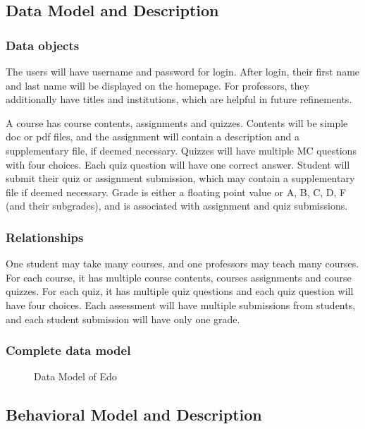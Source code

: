 \documentclass[paper=a4, fontsize=11pt]{scrartcl}
\numberwithin{equation}{section}		%
\numberwithin{figure}{section}			%
\numberwithin{table}{section}				%
\begin{document}
\subsection{Data Model and Description}

\subsubsection{Data objects}
The users will have username and password for login. After login, their first name and last name will be displayed on the homepage. For professors, they additionally have titles and institutions, which are helpful in future refinements.

A course has course contents, assignments and quizzes. Contents will be simple doc or pdf files, and the assignment will contain a description and a supplementary file, if deemed necessary. Quizzes will have multiple MC questions with four choices. Each quiz question will have one correct answer. Student will submit their quiz or assignment submission, which may contain a supplementary file if deemed necessary. Grade is either a floating point value or A, B, C, D, F (and their subgrades), and is associated with assignment and quiz submissions.

\subsubsection{Relationships}
One student may take many courses, and one professors may teach many courses. For each course, it has multiple course contents, courses assignments and course quizzes. For each quiz, it has multiple quiz questions and each quiz question will have four choices. Each assessment will have multiple submissions from students, and each student submission will have only one grade. 

\subsubsection{Complete data model}
\begin{figure}[!ht]
	\begin{center}
	\end{center}
	\caption{Data Model of Edo}
\end{figure}


\subsection{Behavioral Model and Description}
\end{document}

